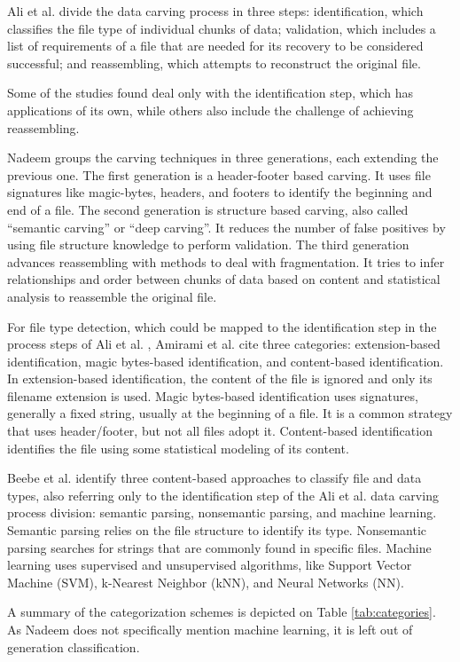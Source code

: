 Ali et al. \cite{ali_review_2018} divide the data carving process in three steps:
    identification, which classifies the file type of individual chunks of data; 
    validation, which includes a list of requirements of a file that are needed for its recovery to be considered successful; and
    reassembling, which attempts to reconstruct the original file.

Some of the studies found deal only with the identification step, which has applications of its own, while others also include the challenge of achieving reassembling.

Nadeem \cite{nadeem_ashraf_forensic_2013} groups the carving techniques in three generations, each extending the previous one.
The first generation is a header-footer based carving. It uses file signatures like magic-bytes, headers, and footers to identify the beginning and end of a file.
The second generation is structure based carving, also called ``semantic carving'' or ``deep carving''. It reduces the number of false positives by using file structure knowledge to perform validation.
The third generation advances reassembling with methods to deal with fragmentation. It tries to infer relationships and order between chunks of data based on content and statistical analysis to reassemble the original file.

For file type detection, which could be mapped to the identification step in the  process steps of Ali et al. \cite{ali_review_2018}, Amirami et al. \cite{amirani_new_2008} cite three categories: extension-based identification, magic bytes-based identification, and content-based identification.
In extension-based identification, the content of the file is ignored and only its filename extension is used. Magic bytes-based identification uses signatures, generally a fixed string, usually at the beginning of a file. It is a common strategy that uses header/footer, but not all files adopt it. Content-based identification identifies the file using some statistical modeling of its content.

Beebe et al. \cite{beebe_sceadan:_2013} identify three content-based approaches to classify file and data types, also referring only to the identification step of the Ali et al. \cite{ali_review_2018} data carving process division: semantic parsing, nonsemantic parsing, and machine learning. Semantic parsing relies on the file structure to identify its type. Nonsemantic parsing searches for strings that are commonly found in specific files. Machine learning uses supervised and unsupervised algorithms, like Support Vector Machine (SVM), k-Nearest Neighbor (kNN), and Neural Networks (NN).

A summary of the categorization schemes is depicted on Table \ref{tab:categories}. As Nadeem \cite{nadeem_ashraf_forensic_2013} does not specifically mention machine learning, it is left out of generation classification.

